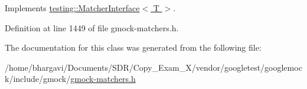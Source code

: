 Implements \hyperlink{classtesting_1_1_matcher_interface_a296b43607cd99d60365f0e6a762777cf}{testing\+::\+Matcher\+Interface$<$ T $>$}.



Definition at line 1449 of file gmock-\/matchers.\+h.



The documentation for this class was generated from the following file\+:\begin{DoxyCompactItemize}
\item 
/home/bhargavi/\+Documents/\+S\+D\+R/\+Copy\+\_\+\+Exam\+\_\+X/vendor/googletest/googlemock/include/gmock/\hyperlink{gmock-matchers_8h}{gmock-\/matchers.\+h}\end{DoxyCompactItemize}
